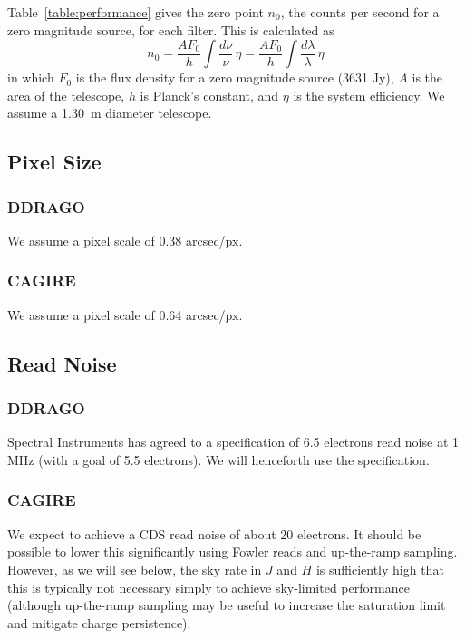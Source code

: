 \documentclass{article}
\begin{document}
Table~\ref{table:performance} gives the zero point $n_0$, the counts per second for a zero magnitude source, for each filter. This is calculated as
\begin{equation}
n_0 = \frac{A F_0}{h} \int\frac{d\nu}{\nu}\,\eta =
\frac{A F_0}{h} \int\frac{d\lambda}{\lambda}\,\eta
\end{equation}
in which $F_0$ is the flux density for a zero magnitude source (3631 Jy), $A$ is the area of the telescope, $h$ is Planck’s constant, and $\eta$ is the system efficiency. We assume a 1.30~m diameter telescope.

\subsection{Pixel Size}

\subsubsection{DDRAGO}

We assume a pixel scale of 0.38 arcsec/px.

\subsubsection{CAGIRE}

We assume a pixel scale of 0.64 arcsec/px.

\subsection{Read Noise}

\subsubsection{DDRAGO}

Spectral Instruments has agreed to a specification of 6.5 electrons read noise at 1 MHz (with a goal of 5.5 electrons). We will henceforth use the specification.

\subsubsection{CAGIRE}

We expect to achieve a CDS read noise of about 20 electrons. It should be possible to lower this significantly using Fowler reads and up-the-ramp sampling. However, as we will see below, the sky rate in $J$ and $H$ is sufficiently high that this is typically not necessary simply to achieve sky-limited performance (although up-the-ramp sampling may be useful to increase the saturation limit and mitigate charge persistence).
\end{document}
